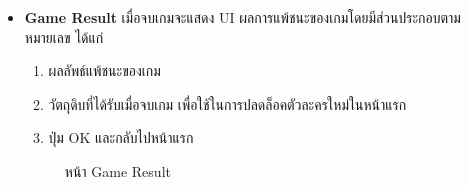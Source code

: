 \documentclass[12pt,oneside,openright,a4paper]{cpe-thai-project}
\begin{document}
\begin{itemize}
  \item \textbf{Game Result}
  เมื่อจบเกมจะแสดง UI ผลการแพ้ชนะของเกมโดยมีส่วนประกอบตามหมายเลข ได้แก่
  \begin{enumerate}
    \item ผลลัพธ์แพ้ชนะของเกม
    \item วัตถุดิบที่ได้รับเมื่อจบเกม เพื่อใช้ในการปลดล็อคตัวละครใหม่ในหน้าแรก
    \item ปุ่ม OK และกลับไปหน้าแรก
  \end{enumerate}
  
  \begin{figure}[H]\centering
    \setlength{\fboxsep}{0cm}
    \caption{หน้า Game Result}\label{fig:3-17}
  \end{figure}
\end{itemize}

\pagebreak
\end{document}
